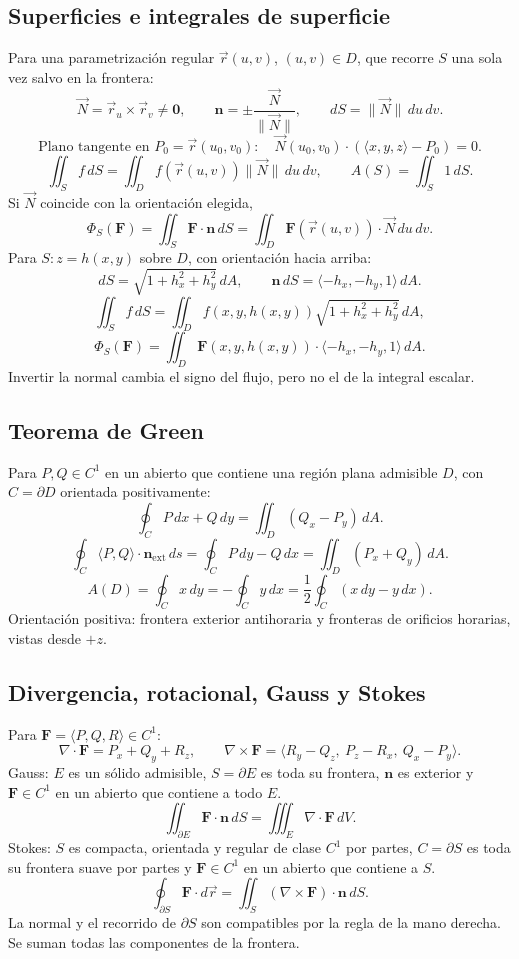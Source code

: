 \subsection*{Superficies e integrales de superficie}
Para una parametrización regular $\vec r(u,v)$, $(u,v)\in D$, que recorre $S$
una sola vez salvo en la frontera:
\[
\vec N=\vec r_u\times\vec r_v\ne\mathbf0,\qquad
\mathbf n=\pm\frac{\vec N}{\|\vec N\|},\qquad
dS=\|\vec N\|\,du\,dv.
\]
\[
\text{Plano tangente en }P_0=\vec r(u_0,v_0):\quad
\vec N(u_0,v_0)\cdot(\langle x,y,z\rangle-P_0)=0.
\]
\[
\iint_S f\,dS=\iint_D f(\vec r(u,v))\|\vec N\|\,du\,dv,
\qquad A(S)=\iint_S1\,dS.
\]
Si $\vec N$ coincide con la orientación elegida,
\[
\Phi_S(\mathbf F)=\iint_S\mathbf F\cdot\mathbf n\,dS
=\iint_D\mathbf F(\vec r(u,v))\cdot\vec N\,du\,dv.
\]
Para $S:z=h(x,y)$ sobre $D$, con orientación hacia arriba:
\[
dS=\sqrt{1+h_x^2+h_y^2}\,dA,\qquad
\mathbf n\,dS=\langle-h_x,-h_y,1\rangle\,dA.
\]
\[
\iint_S f\,dS=\iint_D f(x,y,h(x,y))\sqrt{1+h_x^2+h_y^2}\,dA,
\]
\[
\Phi_S(\mathbf F)=\iint_D\mathbf F(x,y,h(x,y))\cdot\langle-h_x,-h_y,1\rangle\,dA.
\]
Invertir la normal cambia el signo del flujo, pero no el de la integral escalar.

\subsection*{Teorema de Green}
Para $P,Q\in C^1$ en un abierto que contiene una región plana admisible $D$,
con $C=\partial D$ orientada positivamente:
\[
\oint_C P\,dx+Q\,dy=\iint_D(Q_x-P_y)\,dA.
\]
\[
\oint_C\langle P,Q\rangle\cdot\mathbf n_{\mathrm{ext}}\,ds
=\oint_C P\,dy-Q\,dx=\iint_D(P_x+Q_y)\,dA.
\]
\[
A(D)=\oint_C x\,dy=-\oint_C y\,dx
=\frac12\oint_C(x\,dy-y\,dx).
\]
Orientación positiva: frontera exterior antihoraria y fronteras de orificios
horarias, vistas desde $+z$.

\newpage
\subsection*{Divergencia, rotacional, Gauss y Stokes}
Para $\mathbf F=\langle P,Q,R\rangle\in C^1$:
\[
\nabla\cdot\mathbf F=P_x+Q_y+R_z,\qquad
\nabla\times\mathbf F=\langle R_y-Q_z,\ P_z-R_x,\ Q_x-P_y\rangle.
\]
Gauss: $E$ es un sólido admisible, $S=\partial E$ es toda su frontera,
$\mathbf n$ es exterior y $\mathbf F\in C^1$ en un abierto que contiene a todo $E$.
\[
\iint_{\partial E}\mathbf F\cdot\mathbf n\,dS
=\iiint_E\nabla\cdot\mathbf F\,dV.
\]
Stokes: $S$ es compacta, orientada y regular de clase $C^1$ por partes,
$C=\partial S$ es toda su frontera suave por partes y $\mathbf F\in C^1$
en un abierto que contiene a $S$.
\[
\oint_{\partial S}\mathbf F\cdot d\vec r
=\iint_S(\nabla\times\mathbf F)\cdot\mathbf n\,dS.
\]
La normal y el recorrido de $\partial S$ son compatibles por la regla de la mano
 derecha. Se suman todas las componentes de la frontera.

